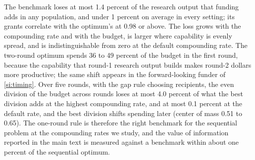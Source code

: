The benchmark loses at most 1.4 percent of the research output that funding adds in any population, and under 1 percent on average in every setting; its grants correlate with the optimum's at 0.98 or above. The loss grows with the compounding rate and with the budget, is larger where capability is evenly spread, and is indistinguishable from zero at the default compounding rate. The two-round optimum spends 36 to 49 percent of the budget in the first round, because the capability that round-1 research output builds makes round-2 dollars more productive; the same shift appears in the forward-looking funder of \ref{si:timing}. Over five rounds, with the gap rule choosing recipients, the even division of the budget across rounds loses at most 4.0 percent of what the best division adds at the highest compounding rate, and at most 0.1 percent at the default rate, and the best division shifts spending later (center of mass 0.51 to 0.65). The one-round rule is therefore the right benchmark for the sequential problem at the compounding rates we study, and the value of information reported in the main text is measured against a benchmark within about one percent of the sequential optimum.
